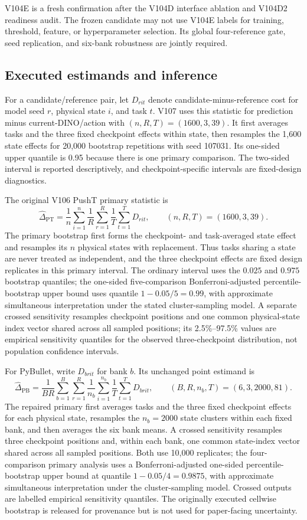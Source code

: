 \documentclass[10pt]{article}
\theoremstyle{definition}
\theoremstyle{remark}
\newcommand{\pusht}{PushT}
\newcommand{\pybullet}{PyBullet}
\begin{document}
V104E is a fresh confirmation after the V104D interface ablation and V104D2
readiness audit.  The frozen candidate may not use V104E labels for training,
threshold, feature, or hyperparameter selection.  Its global four-reference
gate, seed replication, and six-bank robustness are jointly required.

\subsection{Executed estimands and inference}
For a candidate/reference pair, let $D_{rit}$ denote candidate-minus-reference
cost for model seed $r$, physical state $i$, and task $t$.  V107 uses this
statistic for prediction minus current-DINO/action with
$(n,R,T)=(1600,3,39)$.  It first averages tasks and the three fixed checkpoint
effects within state, then resamples the 1,600 state effects for 20,000
bootstrap repetitions with seed 107031.  Its one-sided upper quantile is 0.95
because there is one primary comparison.  The two-sided interval is reported
descriptively, and checkpoint-specific intervals are fixed-design
diagnostics.

The original V106 \pusht{} primary statistic is
\[
 \widehat\Delta_{\mathrm{PT}}
 =
 \frac1n\sum_{i=1}^{n}
 \frac1R\sum_{r=1}^{R}
 \frac1T\sum_{t=1}^{T}D_{rit},
 \qquad (n,R,T)=(1600,3,39).
\]
The primary bootstrap first forms the checkpoint- and task-averaged state
effect and resamples its $n$ physical states with replacement.  Thus tasks
sharing a state are never treated as independent, and the three checkpoint
effects are fixed design replicates in this primary interval.  The ordinary
interval uses the $0.025$ and $0.975$ bootstrap quantiles; the one-sided
five-comparison Bonferroni-adjusted percentile-bootstrap upper bound uses
quantile $1-0.05/5=0.99$, with approximate simultaneous interpretation under
the stated cluster-sampling model.  A separate crossed sensitivity resamples
checkpoint positions and one common physical-state index vector shared across
all sampled positions; its 2.5\%--97.5\% values are empirical sensitivity
quantiles for the observed three-checkpoint distribution, not population
confidence intervals.

For \pybullet{}, write $D_{brit}$ for bank $b$.  Its unchanged point
estimand is
\[
 \widehat\Delta_{\mathrm{PB}}
 =
 \frac1{BR}\sum_{b=1}^{B}\sum_{r=1}^{R}
 \frac1{n_b}\sum_{i=1}^{n_b}
 \frac1T\sum_{t=1}^{T}D_{brit},
 \qquad (B,R,n_b,T)=(6,3,2000,81).
\]
The repaired primary first averages tasks and the three fixed checkpoint
effects for each physical state, resamples the $n_b=2000$ state clusters
within each fixed bank, and then averages the six bank means.  A crossed
sensitivity resamples three checkpoint positions and, within each bank, one
common state-index vector shared across all sampled positions.  Both use
10,000 replicates; the four-comparison primary analysis uses a
Bonferroni-adjusted one-sided percentile-bootstrap upper bound at quantile
$1-0.05/4=0.9875$, with approximate simultaneous interpretation under the
cluster-sampling model.  Crossed outputs are labelled empirical sensitivity
quantiles.  The originally executed cellwise bootstrap is released for
provenance but is not used for paper-facing uncertainty.
\end{document}
